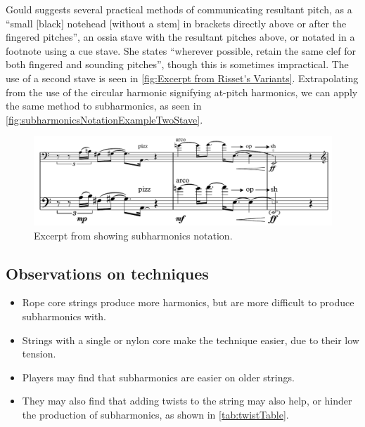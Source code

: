 Gould suggests several practical methods of communicating resultant pitch, as a ``small [black] notehead [without a stem] in brackets directly above or after the fingered pitches'', an ossia stave with the resultant pitches above, or notated in a footnote using a cue stave.\autocite[421]{gouldBars2011}
She states ``wherever possible, retain the same clef for both fingered and sounding pitches'', though this is sometimes impractical.\autocite[422]{gouldBars2011}
The use of a second stave is seen in \autoref{fig:Excerpt from Risset's Variants}.\autocite[It should be noted that Risset's notation omits a fingered pitch, which is not recommended.]{rissetVariants1995}
Extrapolating from the use of the circular harmonic signifying at-pitch harmonics, we can apply the same method to subharmonics, as seen in \autoref{fig:subharmonicsNotationExampleTwoStave}.
\begin{figure}
  \centering
  \includegraphics[width=\linewidth]{./resources/subharmonicsNotationExample.pdf}
  \caption{Excerpt from \bassPiece\space showing subharmonics notation.}\label{fig:subharmonicsNotationExampleTwoStave}
\end{figure}


\subsection{Observations on techniques} %
\begin{itemize}
 \item Rope core strings produce more harmonics, but are more difficult to produce subharmonics with.
 \item Strings with a single or nylon core make the technique easier, due to their low tension.\autocite[99]{welbanksFoundationsModernCello}
 \item Players may find that subharmonics are easier on older strings.\autocite[]{kimuraHowProduceSubharmonics1999}
 \item They may also find that adding twists to the string may also help, or hinder the production of subharmonics, as shown in \autoref{tab:twistTable}.\autocite[]{kimuraHowProduceSubharmonics1999}
\end{itemize}



